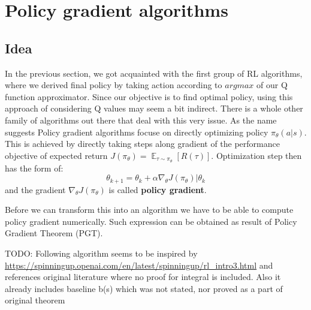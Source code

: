 \section{Policy gradient algorithms}
\subsection{Idea}
In the previous section, we got acquainted with the first group of RL algorithms, where we derived final policy by taking action according to $argmax$ of our Q function approximator.
Since our objective is to find optimal policy, using this approach of considering Q values may seem a bit indirect.
There is a whole other family of algorithms out there that deal with this very issue.
As the name suggests Policy gradient algorithms focuse on directly optimizing policy $\pi_\theta(a|s)$. 
This is achieved by directly taking steps along gradient of the performance objective of expected return $J(\pi_\theta) = \mathop{\mathbb{E}}_{\tau \sim \pi_\theta}[R(\tau)]$.
Optimization step then has the form of:
\[\theta_{k+1} = \theta_k+\alpha  \nabla_\theta J(\pi_\theta)|\theta_k\] and the gradient $\nabla_\theta J(\pi_\theta)$ is called \textbf{policy gradient}.

Before we can transform this into an algorithm we have to be able to compute policy gradient numerically.
Such expression can be obtained as result of Policy Gradient Theorem (PGT).

\par
TODO: Following algorithm seems to be inspired by \url{https://spinningup.openai.com/en/latest/spinningup/rl_intro3.html} and references original literature where no proof for integral is included.
Also it already includes baseline b(s) which was not stated, nor proved as a part of original theorem


